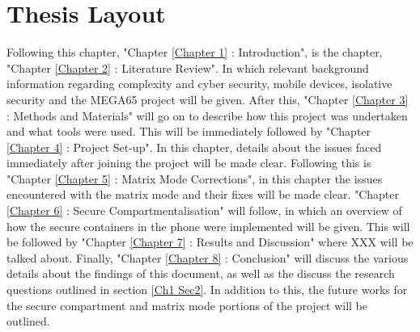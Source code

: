 \section{Thesis Layout}

\label{Ch1 Sec3}

Following this chapter, "Chapter \ref{Chapter 1} : Introduction", is the chapter, "Chapter \ref{Chapter 2} : Literature Review".
In which relevant background information regarding complexity and cyber security, mobile devices, isolative security and the MEGA65 project will be given.
After this, "Chapter \ref{Chapter 3} : Methods and Materials" will go on to describe how this project was undertaken and what tools were used.
This will be immediately followed by "Chapter \ref{Chapter 4} : Project Set-up".
In this chapter, details about the issues faced immediately after joining the project will be made clear.
Following this is "Chapter \ref{Chapter 5} : Matrix Mode Corrections", in this chapter the issues encountered with the matrix mode and their fixes will be made clear.
"Chapter \ref{Chapter 6} : Secure Compartmentalisation" will follow, in which an overview of how the secure containers in the phone were implemented will be given.
This will be followed by "Chapter \ref{Chapter 7} : Results and Discussion" where XXX will be talked about.
Finally, "Chapter \ref{Chapter 8} : Conclusion" will discuss the various details about the findings of this document, as well as the discuss the research questions outlined in section \ref{Ch1 Sec2}. In addition to this, the future works for the secure compartment and matrix mode portions of the project will be outlined.


